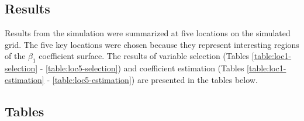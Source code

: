 \documentclass[authoryear, review, 11pt]{elsarticle}
\begin{document}
	\subsection{Results}
	Results from the simulation were summarized at five locations on the simulated grid. The five key locations were chosen because they represent interesting regions of the $\beta_1$ coefficient surface. The results of variable selection (Tables \ref{table:loc1-selection} - \ref{table:loc5-selection}) and coefficient estimation (Tables \ref{table:loc1-estimation} - \ref{table:loc5-estimation}) are presented in the tables below.
	
	\subsection{Tables}
\end{document}
